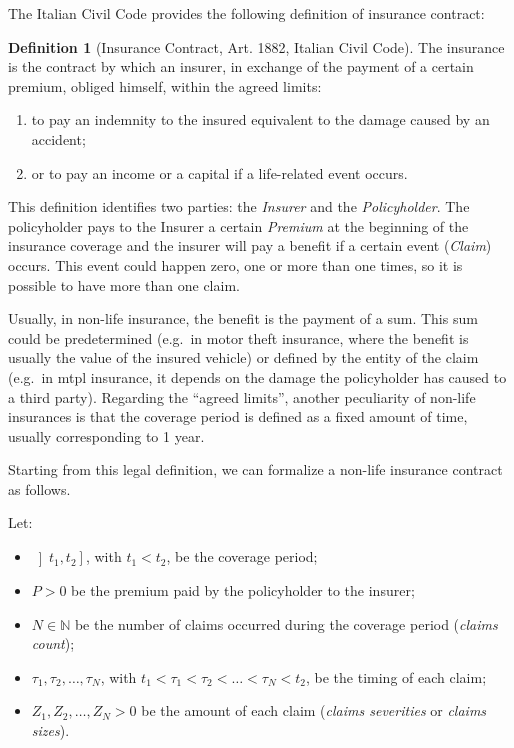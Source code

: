 \documentclass[a4paper, twoside, openright, 12pt]{report}
\providecommand{\tightlist}{%
  \setlength{\itemsep}{0pt}\setlength{\parskip}{0pt}}
\theoremstyle{definition}
\newtheorem{definition}{Definition}[chapter]
\theoremstyle{definition}
\theoremstyle{definition}
\theoremstyle{remark}
\begin{document}
The Italian Civil Code \autocite{italian-civil-code} provides the following definition of insurance contract:

\begin{definition}[Insurance Contract, Art. 1882, Italian Civil Code]
\label{def:ins-contr} \iffalse (Insurance Contract, Art. 1882, Italian Civil Code) \fi{} The insurance is the contract by which an insurer, in exchange of the payment of a certain premium, obliged himself, within the agreed limits:

\begin{enumerate}[noitemsep]
  \item to pay an indemnity to the insured equivalent to the damage caused by an accident;
  \item or to pay an income or a capital if a life-related event occurs.
\end{enumerate}
\end{definition}

This definition identifies two parties: the \emph{Insurer} and the \emph{Policyholder}. The policyholder pays to the Insurer a certain \emph{Premium} at the beginning of the insurance coverage and the insurer will pay a benefit if a certain event (\emph{Claim}) occurs. This event could happen zero, one or more than one times, so it is possible to have more than one claim.

Usually, in non-life insurance, the benefit is the payment of a sum. This sum could be predetermined (e.g.~in motor theft insurance, where the benefit is usually the value of the insured vehicle) or defined by the entity of the claim (e.g.~in \ac{mtpl} insurance, it depends on the damage the policyholder has caused to a third party). Regarding the ``agreed limits'', another peculiarity of non-life insurances is that the coverage period is defined as a fixed amount of time, usually corresponding to 1 year.

Starting from this legal definition, we can formalize a non-life insurance contract as follows.

Let:

\begin{itemize}
\tightlist
\item
  \(\left]t_1, t_2\right]\), with \(t_1<t_2\), be the coverage period;
\item
  \(P>0\) be the premium paid by the policyholder to the insurer;
\item
  \(N\in\mathbb{N}\) be the number of claims occurred during the coverage period (\emph{claims count});
\item
  \(\tau_1, \tau_2, \dots, \tau_N\), with \(t_1<\tau_1< \tau_2 < \dots < \tau_N<t_2\), be the timing of each claim;
\item
  \(Z_1, Z_2, \dots, Z_N > 0\) be the amount of each claim (\emph{claims severities} or \emph{claims sizes}).
\end{itemize}
\end{document}
